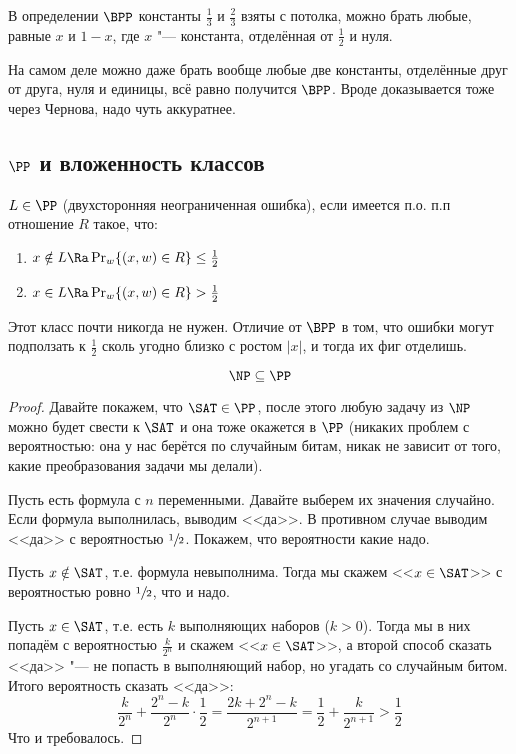 	\begin{conseq}
		В определении $\BPP$ константы $\frac 13$ и $\frac 23$ взяты с потолка, можно брать любые, равные $x$ и $1-x$, где $x$ "--- константа,
		отделённая от $\frac 12$ и нуля.
	\end{conseq}
	\begin{Rem}
		На самом деле можно даже брать вообще любые две константы, отделённые друг от друга, нуля и единицы, всё равно получится $\BPP$.
		Вроде доказывается тоже через Чернова, надо чуть аккуратнее.
		\TODO
	\end{Rem}

\subsection[PP и вложенность классов]{$\PP$ и вложенность классов}
	\begin{Def}
		$L \in \PP$ (двухсторонняя неограниченная ошибка), если имеется п.о. п.п отношение $R$ такое, что:
		\begin{enumerate}
			\item $x \notin L \Ra \Pr_w \{ (x, w) \in R \} \le \frac 12$
			\item $x \in L \Ra \Pr_w \{ (x, w) \in R \} > \frac 12$
		\end{enumerate}
	\end{Def}
	\begin{Rem}
		Этот класс почти никогда не нужен.
		Отличие от $\BPP$ в том, что ошибки могут подползать к $\frac12$ сколь угодно близко с ростом $|x|$, и тогда их фиг отделишь.
	\end{Rem}

	\begin{theorem}
		\[ \NP \subseteq \PP \]
	\end{theorem}
	\begin{proof}
		Давайте покажем, что $\SAT \in \PP$, после этого любую задачу из $\NP$ можно будет свести к $\SAT$ и она тоже окажется в $\PP$
		(никаких проблем с вероятностью: она у нас берётся по случайным битам, никак не зависит от того, какие преобразования задачи мы делали).

		Пусть есть формула с $n$ переменными.
		Давайте выберем их значения случайно.
		Если формула выполнилась, выводим <<да>>.
		В противном случае выводим <<да>> с вероятностью $\sfrac 12$.
		Покажем, что вероятности какие надо.

		Пусть $x \notin \SAT$, т.е. формула невыполнима.
		Тогда мы скажем <<$x \in \SAT$>> с вероятностью ровно $\sfrac 12$, что и надо.

		Пусть $x \in \SAT$, т.е. есть $k$ выполняющих наборов ($k > 0$).
		Тогда мы в них попадём с вероятностью $\frac{k}{2^n}$ и скажем <<$x \in \SAT$>>, а второй способ сказать <<да>> "--- не попасть в выполняющий набор, но
		угадать со случайным битом.
		Итого вероятность сказать <<да>>:
		\[ \frac{k}{2^n} + \frac{2^n-k}{2^n} \cdot \frac 12 = \frac{2k+2^n-k}{2^{n+1}} = \frac12 + \frac{k}{2^{n+1}} > \frac 12 \]
		Что и требовалось.
	\end{proof}

